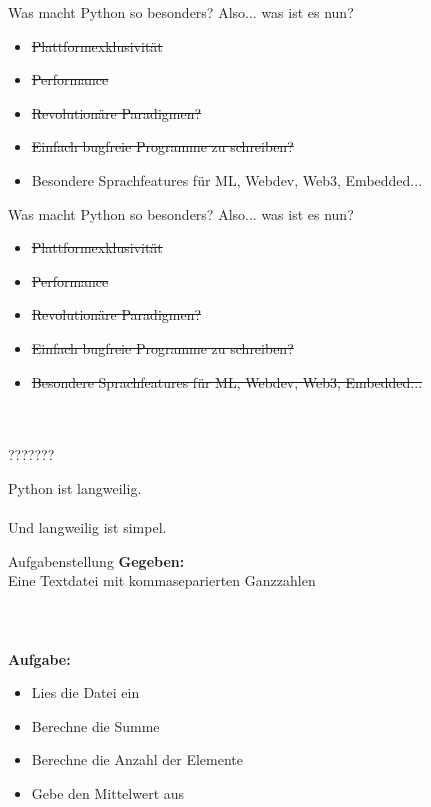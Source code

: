 \documentclass{beamer}
\begin{document}
\begin{frame}[t]{Was macht Python so besonders?}
Also... was ist es nun?
\begin{itemize}
\item \sout{Plattformexklusivität}
\item \sout{Performance}
\item \sout{Revolutionäre Paradigmen?}
\item \sout{Einfach bugfreie Programme zu schreiben?}
\item Besondere Sprachfeatures für ML, Webdev, Web3, Embedded...
\end{itemize}
\end{frame}

\begin{frame}[t]{Was macht Python so besonders?}
Also... was ist es nun?
\begin{itemize}
\item \sout{Plattformexklusivität}
\item \sout{Performance}
\item \sout{Revolutionäre Paradigmen?}
\item \sout{Einfach bugfreie Programme zu schreiben?}
\item \sout{Besondere Sprachfeatures für ML, Webdev, Web3, Embedded...}
\end{itemize}
\begin{center}
{~\\~\\\Huge ???????}
\end{center}
\end{frame}

\begin{frame}
\begin{center}
{ \Huge Python ist langweilig.}\\~\\
\pause
{\Large Und langweilig ist simpel.}
\end{center}
\end{frame}

\begin{frame}[t]{Aufgabenstellung}
\textbf{Gegeben:}\\
\vspace{0.2cm}
Eine Textdatei mit kommaseparierten Ganzzahlen\\~\\~\\~\\
\textbf{Aufgabe:}
\begin{itemize}
\item Lies die Datei ein
\item Berechne die Summe
\item Berechne die Anzahl der Elemente
\item Gebe den Mittelwert aus
\end{itemize}
\end{frame}
\end{document}
